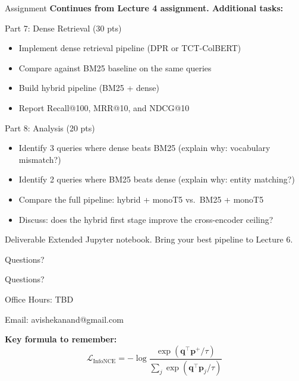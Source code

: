 \documentclass[aspectratio=169]{beamer}
\newcommand{\vq}{\mathbf{q}}
\newcommand{\vp}{\mathbf{p}}
\begin{document}
\begin{frame}{Assignment}
\textbf{Continues from Lecture 4 assignment. Additional tasks:}

\vspace{0.5em}

\begin{block}{Part 7: Dense Retrieval (30 pts)}
\begin{itemize}
    \item Implement dense retrieval pipeline (DPR or TCT-ColBERT)
    \item Compare against BM25 baseline on the same queries
    \item Build hybrid pipeline (BM25 + dense)
    \item Report Recall@100, MRR@10, and NDCG@10
\end{itemize}
\end{block}

\begin{block}{Part 8: Analysis (20 pts)}
\begin{itemize}
    \item Identify 3 queries where dense beats BM25 (explain why: vocabulary mismatch?)
    \item Identify 2 queries where BM25 beats dense (explain why: entity matching?)
    \item Compare the full pipeline: hybrid + monoT5 vs.\ BM25 + monoT5
    \item Discuss: does the hybrid first stage improve the cross-encoder ceiling?
\end{itemize}
\end{block}

\begin{block}{Deliverable}
Extended Jupyter notebook. Bring your best pipeline to Lecture 6.
\end{block}
\end{frame}

\begin{frame}{Questions?}
\begin{center}
\Huge Questions?

\vspace{2em}

\Large
Office Hours: TBD

\vspace{1em}

Email: avishekanand@gmail.com

\vspace{2em}

\normalsize
\textbf{Key formula to remember:}
$$\mathcal{L}_{\text{InfoNCE}} = -\log \frac{\exp(\vq^\top \vp^+ / \tau)}{\sum_{j} \exp(\vq^\top \vp_j / \tau)}$$
\end{center}
\end{frame}
\end{document}
